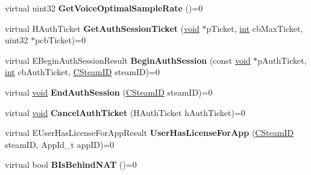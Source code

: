 \begin{DoxyCompactItemize}
\item 
\hypertarget{classISteamUser_a7f0b1a2069a471b88559995432ed5a01}{}virtual uint32 {\bfseries Get\+Voice\+Optimal\+Sample\+Rate} ()=0\label{classISteamUser_a7f0b1a2069a471b88559995432ed5a01}

\item 
\hypertarget{classISteamUser_a5ffd1e0131e3a74d961f6014a823a4cc}{}virtual H\+Auth\+Ticket {\bfseries Get\+Auth\+Session\+Ticket} (\hyperlink{SDL__audio_8h_a52835ae37c4bb905b903cbaf5d04b05f}{void} $\ast$p\+Ticket, \hyperlink{SDL__thread_8h_a6a64f9be4433e4de6e2f2f548cf3c08e}{int} cb\+Max\+Ticket, uint32 $\ast$pcb\+Ticket)=0\label{classISteamUser_a5ffd1e0131e3a74d961f6014a823a4cc}

\item 
\hypertarget{classISteamUser_a43f76c4da6eda398d1838a58f1ec4374}{}virtual E\+Begin\+Auth\+Session\+Result {\bfseries Begin\+Auth\+Session} (const \hyperlink{SDL__audio_8h_a52835ae37c4bb905b903cbaf5d04b05f}{void} $\ast$p\+Auth\+Ticket, \hyperlink{SDL__thread_8h_a6a64f9be4433e4de6e2f2f548cf3c08e}{int} cb\+Auth\+Ticket, \hyperlink{classCSteamID}{C\+Steam\+I\+D} steam\+I\+D)=0\label{classISteamUser_a43f76c4da6eda398d1838a58f1ec4374}

\item 
\hypertarget{classISteamUser_adc1f5a4bb8630ee630a09625e1abdba1}{}virtual \hyperlink{SDL__audio_8h_a52835ae37c4bb905b903cbaf5d04b05f}{void} {\bfseries End\+Auth\+Session} (\hyperlink{classCSteamID}{C\+Steam\+I\+D} steam\+I\+D)=0\label{classISteamUser_adc1f5a4bb8630ee630a09625e1abdba1}

\item 
\hypertarget{classISteamUser_a6c278ab86639cc929816d8f3b7a17a77}{}virtual \hyperlink{SDL__audio_8h_a52835ae37c4bb905b903cbaf5d04b05f}{void} {\bfseries Cancel\+Auth\+Ticket} (H\+Auth\+Ticket h\+Auth\+Ticket)=0\label{classISteamUser_a6c278ab86639cc929816d8f3b7a17a77}

\item 
\hypertarget{classISteamUser_a925dc981e305be647259d138cfd362f6}{}virtual E\+User\+Has\+License\+For\+App\+Result {\bfseries User\+Has\+License\+For\+App} (\hyperlink{classCSteamID}{C\+Steam\+I\+D} steam\+I\+D, App\+Id\+\_\+t app\+I\+D)=0\label{classISteamUser_a925dc981e305be647259d138cfd362f6}

\item 
\hypertarget{classISteamUser_acb4dd088859b733337936c9766f7790f}{}virtual bool {\bfseries B\+Is\+Behind\+N\+A\+T} ()=0\label{classISteamUser_acb4dd088859b733337936c9766f7790f}


\end{DoxyCompactItemize}
